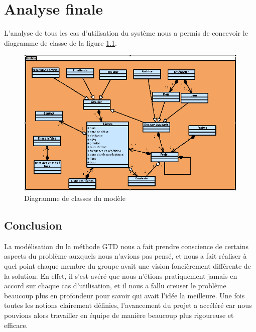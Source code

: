 \chapter{Analyse finale}

L'analyse de tous les cas d'utilisation du système nous a permis de concevoir le diagramme de classe de la figure \ref{ddc}.

\begin{figure}[!ht]
\begin{center}
\includegraphics[width=12cm]{images/DiagrammedeClasse.png}
\caption{Diagramme de classes du modèle}
\label{ddc}
\end{center}
\end{figure}

\newpage
\section{Conclusion}

La modélisation du la méthode GTD nous a fait prendre conscience de certains aspects du problème auxquels nous n'avions pas pensé, et nous a fait réaliser à quel point chaque membre du groupe avait une vision foncièrement différente de la solution.
En effet, il s'est avéré que nous n'étions pratiquement jamais en accord sur chaque cas d'utilisation, et il nous a fallu creuser le problème beaucoup plus en profondeur pour savoir qui avait l'idée la meilleure.
Une fois toutes les notions clairement définies, l'avancement du projet a accéléré car nous pouvions alors travailler en équipe de manière beaucoup plus rigoureuse et efficace.
